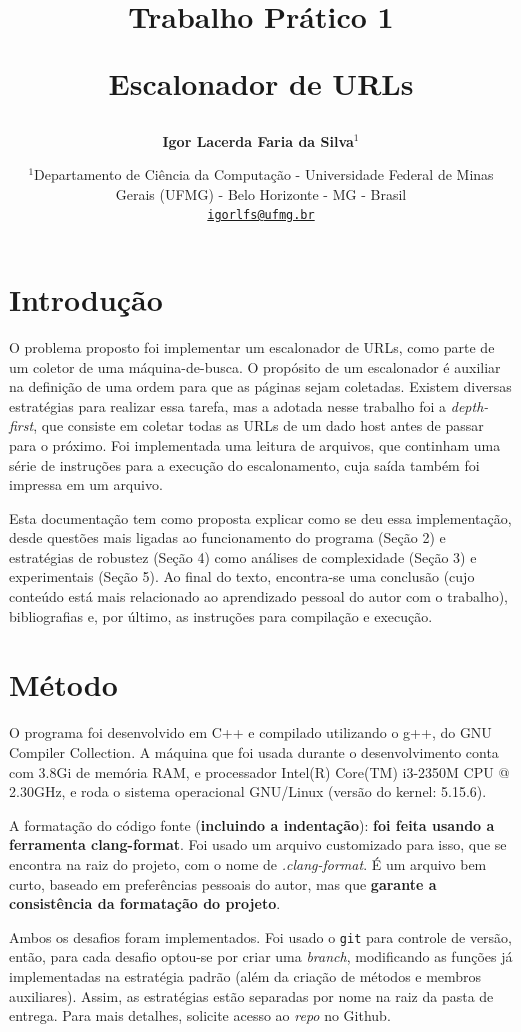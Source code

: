 \documentclass{article}
\author{\textbf{Igor Lacerda Faria da Silva\( ^1 \)} }
\title{\textbf{Trabalho Prático 1}

\textbf{Escalonador de URLs}}
\date{%
    \( ^1 \)Departamento de Ciência da Computação - Universidade Federal de Minas Gerais (UFMG) - Belo Horizonte - MG - Brasil \\ [2ex]
    \href{mailto:igorlfs@ufmg.br}{\nolinkurl{igorlfs@ufmg.br}}
}
\def\code#1{\texttt{#1}}
\begin{document}
\maketitle

\section{Introdução}

O problema proposto foi implementar um escalonador de URLs, como parte de um coletor de uma máquina-de-busca. O propósito de um escalonador é auxiliar na definição de uma ordem para que as páginas sejam coletadas. Existem diversas estratégias para realizar essa tarefa, mas a adotada nesse trabalho foi a \textit{depth-first}, que consiste em coletar todas as URLs de um dado host antes de passar para o próximo. Foi implementada uma leitura de arquivos, que continham uma série de instruções para a execução do escalonamento, cuja saída também foi impressa em um arquivo.

Esta documentação tem como proposta explicar como se deu essa implementação, desde questões mais ligadas ao funcionamento do programa (Seção 2) e estratégias de robustez (Seção 4) como análises de complexidade (Seção 3) e experimentais (Seção 5). Ao final do texto, encontra-se uma conclusão (cujo conteúdo está mais relacionado ao aprendizado pessoal do autor com o trabalho), bibliografias e, por último, as instruções para compilação e execução.

\section{Método}

O programa foi desenvolvido em C++ e compilado utilizando o g++, do GNU Compiler Collection. A máquina que foi usada durante o desenvolvimento conta com 3.8Gi de memória RAM, e processador Intel(R) Core(TM) i3-2350M CPU @ 2.30GHz, e roda o sistema operacional GNU/Linux (versão do kernel: 5.15.6).

A formatação do código fonte (\textbf{incluindo a indentação}): \textbf{foi feita usando a ferramenta clang-format}. Foi usado um arquivo customizado para isso, que se encontra na raiz do projeto, com o nome de \textit{.clang-format}. É um arquivo bem curto, baseado em preferências pessoais do autor, mas que \textbf{garante a consistência da formatação do projeto}.

Ambos os desafios foram implementados. Foi usado o \code{git} para controle de versão, então, para cada desafio optou-se por criar uma \textit{branch}, modificando as funções já implementadas na estratégia padrão (além da criação de métodos e membros auxiliares). Assim, as estratégias estão separadas por nome na raiz da pasta de entrega. Para mais detalhes, solicite acesso ao \textit{repo} no Github.
\end{document}
